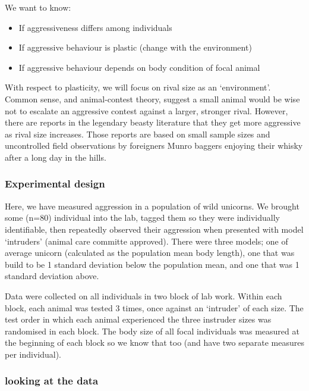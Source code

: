 \documentclass[
  12pt,
]{book}
\providecommand{\tightlist}{%
  \setlength{\itemsep}{0pt}\setlength{\parskip}{0pt}}
\begin{document}
We want to know:

\begin{itemize}
\tightlist
\item
  If aggressiveness differs among individuals
\item
  If aggressive behaviour is plastic (change with the environment)
\item
  If aggressive behaviour depends on body condition of focal animal
\end{itemize}

With respect to plasticity, we will focus on rival size as an `environment'. Common sense, and animal-contest theory, suggest a small animal would be wise not to escalate an aggressive contest against a larger, stronger rival. However, there are reports in the legendary beasty literature that they get more aggressive as rival size increases. Those reports are based on small sample sizes and uncontrolled field observations by foreigners Munro baggers enjoying their whisky after a long day in the hills.

\hypertarget{experimental-design}{%
\subsubsection{Experimental design}\label{experimental-design}}

Here, we have measured aggression in a population of wild unicorns. We brought some (n=80) individual into the lab, tagged them so they were individually identifiable, then repeatedly observed their aggression when presented with model `intruders' (animal care committe approved). There were three models; one of average unicorn (calculated as the population mean body length), one that was build to be 1 standard deviation below the population mean, and one that was 1 standard deviation above.

Data were collected on all individuals in two block of lab work. Within each block, each animal was tested 3 times, once against an `intruder' of each size. The test order in which each animal experienced the three instruder sizes was randomised in each block. The body size of all focal individuals was measured at the beginning of each block so we know that too (and have two separate measures per individual).

\hypertarget{looking-at-the-data}{%
\subsubsection{looking at the data}\label{looking-at-the-data}}
\end{document}
